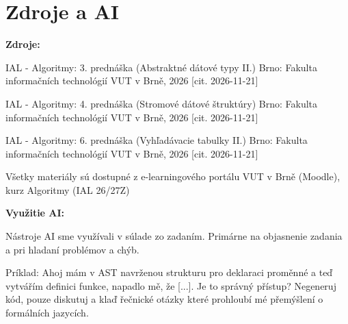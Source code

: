 \section{Zdroje a AI}

\vspace{1.5em}
{ \large \sloppy
\noindent\textbf{Zdroje:}

\vspace{0.75em}
\noindent [1] IAL - Algoritmy: 3. prednáška (Abstraktné dátové typy II.) Brno: Fakulta informačních technológií VUT v Brně, 2026 [cit. 2026-11-21]

\vspace{0.75em}
\noindent [2] IAL - Algoritmy: 4. prednáška (Stromové dátové štruktúry) Brno: Fakulta informačních technológií VUT v Brně, 2026 [cit. 2026-11-21]

\vspace{0.75em}
\noindent [3] IAL - Algoritmy: 6. prednáška (Vyhľadávacie tabulky II.) Brno: Fakulta informačních technológií VUT v Brně, 2026 [cit. 2026-11-21]

\vspace{0.75em}
\noindent Všetky materiály sú dostupné z e-learningového portálu VUT v Brně (Moodle), kurz Algoritmy (IAL 26/27Z)

\vspace{1.5em}

\noindent\textbf{Využitie AI:}

\vspace{0.75em}
\noindent Nástroje AI sme využívali v súlade zo zadaním. Primárne na objasnenie zadania a pri hladaní problémov a chýb.

\vspace{0.75em}
\noindent Príklad: Ahoj mám v AST navrženou strukturu pro deklaraci proměnné a teď vytvářím definici funkce, napadlo mě, že [...]. Je to správný přístup? Negeneruj kód, pouze diskutuj a klaď řečnické otázky které prohloubí mé přemýšlení o formálních jazycích. 
}